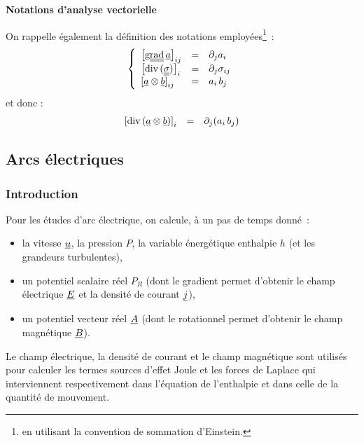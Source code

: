 \vspace*{0,5cm}
{\bf Notations d'analyse vectorielle}
\nopagebreak

On rappelle également la définition des notations employées\footnote{en
utilisant la convention de sommation d'Einstein.}~:
\begin{equation}\notag
\left\{\begin{array}{lll}
\left[\text{g}\underline{\underline{{\text{rad}}}}\,{\underline{a}}\right]_{ij} &=& \partial_j a_i\\
\left[\text{div}\,(\underline{\underline{\sigma}})\right]_i &=& \partial_j \sigma_{ij}\\
\left[\underline{a}\otimes\underline{b}\right]_{ij} &= &
a_i\,b_j\\
\end{array}\right.
\end{equation}
et donc :
\begin{equation}\notag
\begin{array}{lll}
\left[\text{div}\,(\underline{a}\otimes\underline{b})\right]_i &= &
\partial_j (a_i\,b_j)
\end{array}
\end{equation}


\subsection*{Arcs électriques}

\subsubsection*{Introduction}

Pour les études d'arc électrique, on calcule,
à un pas de temps donné~:
\begin{itemize}
\item la vitesse $\underline{u}$, la pression $P$, la variable énergétique
enthalpie $h$ (et les grandeurs turbulentes),
\item un potentiel scalaire réel $P_R$
(dont le gradient permet d'obtenir le champ électrique $\underline{E}$ et
la densité de courant $\underline{j}$),
\item un potentiel vecteur réel $\underline{A}$ (dont
le rotationnel permet d'obtenir  le champ magnétique $\underline{B}$).
\end{itemize}

\bigskip
Le champ électrique, la
densité de courant et le champ magnétique sont utilisés pour calculer les
termes sources d'effet Joule et les forces de Laplace qui interviennent
respectivement dans l'équation de l'enthalpie et dans celle
de la quantité de mouvement.


